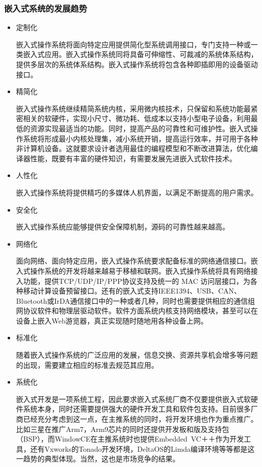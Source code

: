 \documentclass[12pt, a4paper]{article}
\begin{document}
	\subsubsection{嵌入式系统的发展趋势}
	\begin{itemize}
		
	\item 定制化
	
	嵌入式操作系统将面向特定应用提供简化型系统调用接口，专门支持一种或一类嵌入式应用。嵌入式操作系统同将具备可伸缩性、可裁减的系统体系结构，提供多层次的系统体系结构。嵌入式操作系统将包含各种即插即用的设备驱动接口。
	
	\item 精简化
	
	嵌入式操作系统继续精简系统内核，采用微内核技术，只保留和系统功能最紧密相关的软硬件，实现小尺寸、微功耗、低成本以支持小型电子设备，利用最低的资源实现最适当的功能。同时，提高产品的可靠性和可维护性。嵌入式操作系统将形成最小内核处理集，减小系统开销，提高运行效率，并可用于各种非计算机设备。这就要求设计者选用最佳的编程模型和不断改进算法，优化编译器性能，既要有丰富的硬件知识，有需要发展先进嵌入式软件技术。
	
	\item 人性化
	
	嵌入式操作系统将提供精巧的多媒体人机界面，以满足不断提高的用户需求。
	
	\item 安全化
	
	嵌入式操作系统应能够提供安全保障机制，源码的可靠性越来越高。
	
	\item 网络化
	
	面向网络、面向特定应用，嵌入式操作系统要求配备标准的网络通信接口。嵌入式操作系统的开发将越来越易于移植和联网。嵌入式操作系统将具有网络接入功能，提供TCP/UDP/IP/PPP协议支持及统一的 MAC 访问层接口，为各种移动计算设备预留接口。还有的嵌入式支持IEEE1394、USB、CAN、Bluetooth或IrDA通信接口中的一种或者几种，同时也需要提供相应的通信组网协议软件和物理层驱动软件。软件方面系统内核支持网络模块，甚至可以在设备上嵌入Web游览器，真正实现随时随地用各种设备上网。
	
	\item 标准化
	
	随着嵌入式操作系统的广泛应用的发展，信息交换、资源共享机会增多等问题的出现，需要建立相应的标准去规范其应用。
	
	\item 系统化
	
	嵌入式开发是一项系统工程，因此要求嵌入式系统厂商不仅要提供嵌入式软硬件系统本身，同时还需要提供强大的硬件开发工具和软件包支持。目前很多厂商已经充分考虑到这一点，在主推系统的同时，将开发环境也作为重点推广。比如三星在推广Arm7，Arm9芯片的同时还提供开发板和版及支持包（BSP），而WindowCE在主推系统时也提供Embedded VC＋＋作为开发工具，还有Vxworks的Tonado开发环境，DeltaOS的Limda编译环境等等都是这一趋势的典型体现。当然，这也是市场竞争的结果。
	

\end{itemize}
\end{document}

